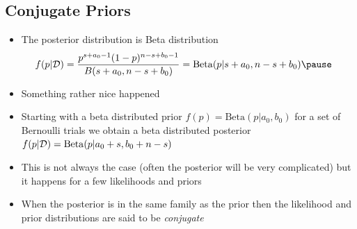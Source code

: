 
\begin{slide}
\section[-2]{Conjugate Priors}

\begin{PauseHighLight}
  \begin{itemize}
  \item The posterior distribution is Beta distribution
    \begin{align*}
      f(p|\data) &= 
      \frac{p^{s+a_0-1} (1-p)^{n-s+b_0-1}}{B(s+a_0,n-s+b_0)} =
                   \mathrm{Beta}(p|s+a_0,n-s+b_0)\pause
    \end{align*}
  \item Something rather nice happened\pause
  \item Starting with a beta distributed prior
    $f(p) = \mathrm{Beta}(p|a_0,b_0)$ for a set of Bernoulli trials we
    obtain a beta distributed posterior
    $f(p|\mathcal{D}) = \mathrm{Beta}(p| a_0+s, b_0+n-s)$\pause
  \item This is not always the case (often the posterior will be very
    complicated) but it happens for a few likelihoods and priors\pause
  \item When the posterior is in the same family as the prior then the
    likelihood and prior distributions are said to be
    \emph{conjugate}\pause
  \end{itemize}
\end{PauseHighLight}

\end{slide}



